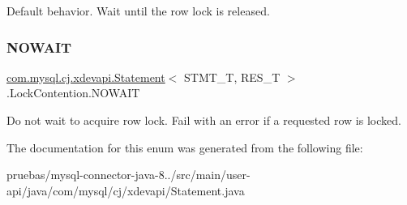 Default behavior. Wait until the row lock is released. \mbox{\label{enumcom_1_1mysql_1_1cj_1_1xdevapi_1_1_statement_1_1_lock_contention_aeee9ef730095721fb0fb801706ad6a7f}} 
\subsubsection{\texorpdfstring{N\+O\+W\+A\+IT}{NOWAIT}}
{\footnotesize\ttfamily \mbox{\hyperlink{interfacecom_1_1mysql_1_1cj_1_1xdevapi_1_1_statement}{com.\+mysql.\+cj.\+xdevapi.\+Statement}}$<$ S\+T\+M\+T\+\_\+T, R\+E\+S\+\_\+T $>$.Lock\+Contention.\+N\+O\+W\+A\+IT}

Do not wait to acquire row lock. Fail with an error if a requested row is locked. 

The documentation for this enum was generated from the following file\+:\begin{DoxyCompactItemize}
\item 
pruebas/mysql-\/connector-\/java-\/8../src/main/user-\/api/java/com/mysql/cj/xdevapi/Statement.\+java\end{DoxyCompactItemize}
